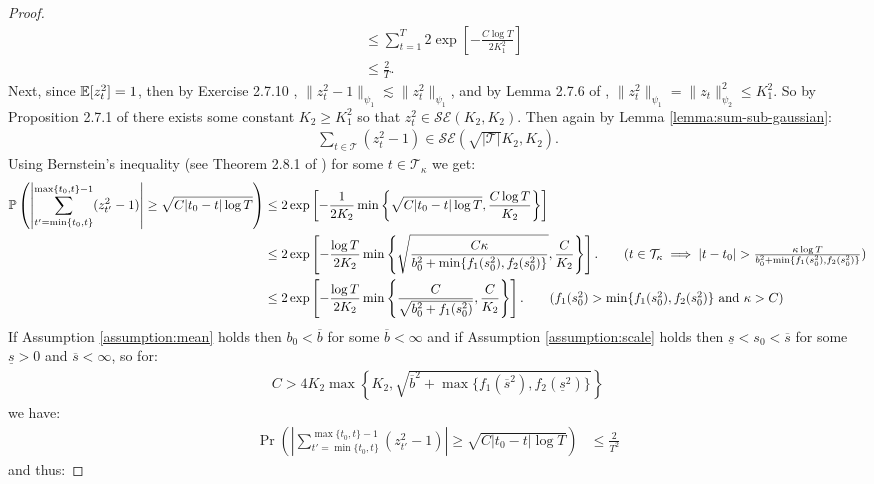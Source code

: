 \begin{proof}
\begin{align*}
    &\leq \sum_{t =1}^T 2\exp\left[-\frac{C \log T}{2K^2_1}\right] \\
    &\leq \frac{2}{T}.  \tag{$C > 4K_1^2$}
\end{align*}
\normalsize
Next, since $\mathbb{E}[z^2_t] =1$, then by Exercise 2.7.10 \citealp{Vershynin18}, $\lVert z^2_t - 1 \rVert_{\psi_1} \lesssim \lVert z^2_t \rVert_{\psi_1}$, and by Lemma 2.7.6 of \citealp{Vershynin18}, $\lVert z^2_t \rVert_{\psi_1} = \lVert z_t \rVert_{\psi_2}^2 \leq K_1^2$. So by Proposition 2.7.1 of \citealp{Vershynin18} there exists some constant $K_2\geq K_1^2$ so that $z_t^2\in\mathcal{SE}(K_2,K_2)$. Then again by Lemma \ref{lemma:sum-sub-gaussian}:
\begin{align*}
    \sum_{t\in\mathcal{T}} (z^2_t -1) \in\mathcal{SE}\left(\sqrt{|\mathcal{T}|}K_2,K_2\right).
\end{align*}
Using Bernstein’s inequality (see Theorem 2.8.1 of \cite{Vershynin18}) for some $t \in \mathcal{T}_\kappa$ we get:
\begin{align*}
     \Pr\left(\left|\sum_{t'=\min\{t_0,t\}}^{\max\{t_0,t\}-1} (z^2_{t'}-1)\right| \geq \sqrt{C|t_0-t|\log T}\right) &\leq 2\exp\left[-\frac{1}{2K_2} \min\left\{\sqrt{C|t_0-t|\log T}, \frac{C\log T}{K_2}\right\}\right] \\
     &\leq  2\exp\left[-\frac{\log T}{2K_2} \min\left\{\sqrt{\frac{C\kappa}{b_0^2 + \min\{f_1(s^2_0), f_2(s_0^2)\}}}, \frac{C
     }{K_2}\right\}\right]. \tag{$t \in \mathcal{T}_{\kappa} \implies |t-t_0|> \frac{\kappa\log T}{b_0^2 + \min\{f_1(s^2_0), f_2(s_0^2)\}} $} \\
     &\leq  2\exp\left[-\frac{\log T}{2K_2} \min\left\{\frac{C}{\sqrt{b_0^2 + f_1(s^2_0)}}, \frac{C
     }{K_2}\right\}\right]. \tag{$f_1(s^2_0) > \min\{f_1(s^2_0), f_2(s_0^2)\}$ and $\kappa > C$}
\end{align*}
If Assumption \ref{assumption:mean} holds then $b_0 < \overline{b}$ for some $\overline{b} < \infty$ and if Assumption \ref{assumption:scale} holds then $\underline{s} < s_0 < \overline{s}$ for some $\underline{s} > 0$ and $\overline{s} < \infty$, so for:
\begin{align*}
    C > 4K_2\max\left\{K_2,  \sqrt{\overline{b}^2 + \max\{f_1(\overline{s}^2), f_2(\underline{s}^2)\}}\right\}
\end{align*}
we have:
\begin{align*}
     \Pr\left(\left|\sum_{t'=\min\{t_0,t\}}^{\max\{t_0,t\}-1} (z^2_{t'}-1)\right| \geq \sqrt{C|t_0-t|\log T}\right) &\leq \frac{2}{T^2}
\end{align*}
and thus:

\end{proof}

